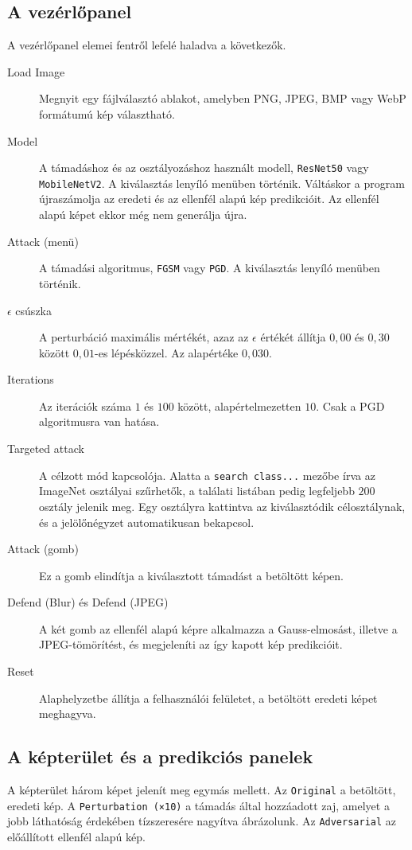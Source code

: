 \subsection{A vezérlőpanel}
A vezérlőpanel elemei fentről lefelé haladva a következők. 
\begin{description}
  \item[Load Image] Megnyit egy fájlválasztó ablakot, amelyben PNG, JPEG, BMP vagy WebP formátumú kép választható. 
  \item[Model] A támadáshoz és az osztályozáshoz használt modell, \texttt{ResNet50} vagy \texttt{MobileNetV2}. 
        A kiválasztás lenyíló menüben történik. 
        Váltáskor a program újraszámolja az eredeti és az ellenfél alapú kép predikcióit. 
        Az ellenfél alapú képet ekkor még nem generálja újra. 
  \item[Attack (menü)] A támadási algoritmus, \texttt{FGSM} vagy \texttt{PGD}. 
        A kiválasztás lenyíló menüben történik. 
  \item[$\epsilon$ csúszka] A perturbáció maximális mértékét, azaz az $\epsilon$ értékét állítja $0{,}00$ és $0{,}30$ között 
        $0{,}01$-es lépésközzel. 
        Az alapértéke $0{,}030$. 
  \item[Iterations] Az iterációk száma $1$ és $100$ között, alapértelmezetten $10$. 
        Csak a PGD algoritmusra van hatása. 
  \item[Targeted attack] A célzott mód kapcsolója. 
        Alatta a \texttt{search class...} mezőbe írva az ImageNet osztályai szűrhetők, a találati listában pedig 
        legfeljebb $200$ osztály jelenik meg. 
        Egy osztályra kattintva az kiválasztódik célosztálynak, és a jelölőnégyzet automatikusan bekapcsol. 
  \item[Attack (gomb)] Ez a gomb elindítja a kiválasztott támadást a betöltött képen. 
  \item[Defend (Blur) és Defend (JPEG)] A két gomb az ellenfél alapú képre alkalmazza a Gauss-elmosást, illetve a 
        JPEG-tömörítést, és megjeleníti az így kapott kép predikcióit. 
  \item[Reset] Alaphelyzetbe állítja a felhasználói felületet, a betöltött eredeti képet meghagyva. 
\end{description}

\subsection{A képterület és a predikciós panelek}
A képterület három képet jelenít meg egymás mellett. 
Az \texttt{Original} a betöltött, eredeti kép. 
A \texttt{Perturbation (×10)} a támadás által hozzáadott zaj, amelyet a jobb láthatóság érdekében tízszeresére nagyítva 
ábrázolunk. 
Az \texttt{Adversarial} az előállított ellenfél alapú kép. 

